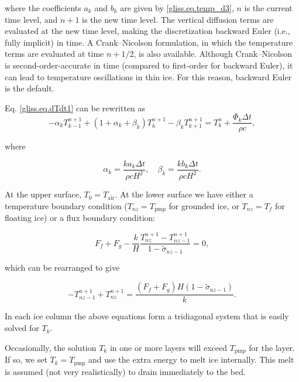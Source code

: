 \noindent
where the coefficients $a_k$ and $b_k$ are given by \eqref{gliss.eq.temp_d3}, $n$ is the current time level,
and $n+1$ is the new time level.  The vertical diffusion terms are evaluated at the new time level,
making the discretization backward Euler (i.e., fully implicit) in time.  A Crank--Nicolson formulation, in which the temperature
terms are evaluated at time $n+1/2$, is also available.  Although Crank--Nicolson is second-order-accurate
in time (compared to first-order for backward Euler), it can lead to temperature oscillations in thin ice.
For this reason, backward Euler is the default.

Eq. \eqref{gliss.eq.dTdt1} can be rewritten as
\begin{equation}
  \label{gliss.eq.dTdt2}
  -{{\alpha }_{k}}T_{k-1}^{n+1} + (1+{{\alpha }_{k}}+{{\beta }_{k}})T_{k}^{n+1} - {{\beta }_{k}}T_{k+1}^{n+1} =
  T_{k}^{n} + \frac{{{\Phi }_{k}}\Delta t}{\rho c},
\end{equation}

\noindent
where

\begin{equation}
   {{\alpha }_{k}}=\frac{k{{a}_{k}}\Delta t}{\rho c H^2}, \quad {{\beta }_{k}}=\frac{k{{b}_{k}}\Delta t}{\rho c H^2}.
\end{equation}

\noindent
At the upper surface, $T_0 = T_{\mathrm{air}}$.  At the lower surface we have either 
a temperature boundary condition ($T_{nz} = T_{\mathrm{pmp}}$ for grounded ice, or
$T_{nz} = T_f$ for floating ice) or a flux boundary condition:

\begin{equation}
  \label{gliss.eq.lower_flux_bc}
  {{F}_{f}}+{{F}_{g}}-\frac{k}{H}\frac{T_{nz}^{n+1}-T_{nz-1}^{n+1}}{1-{{{\tilde{\sigma }}}_{nz-1}}} = 0,
\end{equation}

\noindent
which can be rearranged to give

\begin{equation}
  \label{gliss.eq.lower_flux_bc2}
  -T_{nz-1}^{n+1}+T_{nz}^{n+1} = \frac{\left( {{F}_{f}}+{{F}_{g}} \right)H\left( 1-{{{\tilde{\sigma }}}_{nz-1}} \right)}{k}.
\end{equation}

\noindent
In each ice column the above equations form a tridiagonal system that is easily solved for $T_k$.

Occasionally, the solution $T_k$ in one or more layers will exceed $T_{\mathrm{pmp}}$ for the layer.
If so, we set $T_k = T_{\mathrm{pmp}}$ and use the extra energy to melt ice internally.
This melt is assumed (not very realistically) to drain immediately to the bed.

